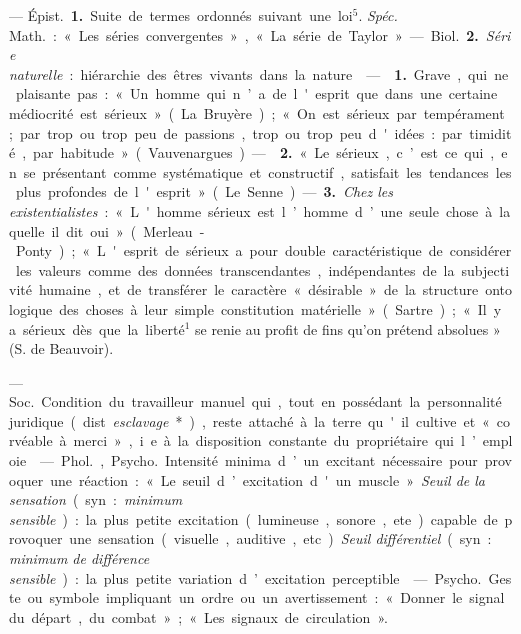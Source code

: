 \begin{itemize}[leftmargin=1cm, label=, itemsep=1pt]
 — \si{Épist.} {\bf 1.} Suite de termes ordonnés suivant une
loi$^5$. {\it Spéc.} \si{Math.} : « Les séries convergentes », « La série de
Taylor ». — \si{Biol.} {\bf 2.} {\it Série naturelle} : hiérarchie des êtres
vivants dans la nature.

 —  {\bf 1.} Grave, qui ne plaisante pas : « Un
homme qui n’a de l'esprit que dans une certaine médiocrité est sérieux » (La
Bruyère) ; « On est sérieux par tempérament; par trop ou trop peu de
passions, trop ou trop peu d'idées : par timidité, par
habitude » (Vauvenargues). —  {\bf 2.} « Le sérieux, c’est ce
qui, en se présentant comme systématique et constructif, satisfait les
tendances les plus profondes de l'esprit » (Le Senne).

— {\bf 3.} {\it Chez les existentialistes} : « L'homme sérieux est l’homme
d’une seule chose à laquelle il dit oui » (Merleau-Ponty) ; « L'esprit de
sérieux a pour double caractéristique de considérer les valeurs comme des
données transcendantes, indépendantes de la subjectivité humaine, et de
transférer le caractère « désirable » de la structure ontologique des choses
à leur simple constitution matérielle » (Sartre) ; « Il y a sérieux dès que
la liberté$^1$ se renie au profit de fins qu'on prétend absolues » (S. de
Beauvoir).

 — \si{Soc.} Condition du travailleur manuel qui, tout en
possédant la personnalité juridique (dist. {\it esclavage}*), reste attaché à
la terre qu'il cultive et « corvéable à merci », i.e. à la disposition
constante du propriétaire qui l’emploie.

 — \si{Phol.}, \si{Psycho.} Intensité minima d’un excitant
nécessaire pour provoquer une réaction : « Le seuil d’excitation d'un
muscle ». {\it Seuil de la sensation} (syn. : {\it minimum sensible}) : la
plus petite excitation (lumineuse, sonore, ete.) capable de provoquer une
sensation (visuelle, auditive, etc). {\it Seuil différentiel} (syn. : {\it
minimum de différence sensible}) :
la plus petite variation d’excitation perceptible.

 — \si{Psycho.} Geste ou symbole impliquant un ordre ou un
avertissement : « Donner le signal du départ, du combat »; « Les signaux de
circulation ».


\end{itemize}
